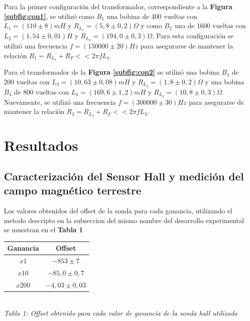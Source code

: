 \documentclass[11pt,a4paper]{article}
\begin{document}
Para la primer configuración del transformador, correspondiente a la \textbf{Figura \ref{subfig:con1}}, se utilizó como $B_1$ una bobina de 400 vueltas con $L_1 = (110 \pm 8)mH$ y $R_{L_1} = (5,8 \pm 0,2)\Omega$ y como $B_2$ una de 1600 vueltas con $L_2 = (1,54 \pm 0,01)H$ y $R_{L_2} = (194,0 \pm 0,3)\Omega$. Para esta configuración se utilizó una frecuencia $f = (150000 \pm 20)Hz$ para asegurarse de mantener la relación $R_1 = R_{L_1}+R_F << 2\pi fL_1$.

Para el transformador de la \textbf{Figura \ref{subfig:con2}} se utilizó una bobina $B_3$ de 200 vueltas con $L_3 = (10,63 \pm 0,08)mH$ y $R_{L_3} = (1,8 \pm 0,2)\Omega$ y una bobina $B_4$ de 800 vueltas con $L_4 = (169,6 \pm 1,2)mH$ y $R_{L_4} = (10,8 \pm 0,3)\Omega$. Nuevamente,  se utilizó una frecuencia $f = (300000 \pm 30)Hz$ para asegurarse de mantener la relación $R_3 = R_{L_3}+R_F << 2\pi fL_3$.




\section{Resultados}
\label{sec:discusion}

\subsection{Caracterización del Sensor Hall y medición del campo magnético terrestre}

Los valores obtenidos del offset de la sonda para cada ganancia, utilizando el metodo descripto en la subseccion del mismo nombre del desarrollo experimental se muestran en el \textbf{Tabla 1}


\bigskip
\begin{minipage}{\linewidth}
\centering
\begin{tabular}{||c|c||}
\hline 
\label{tab:offset}
\textbf{Ganancia} & \textbf{Offset} \\ \hline 
$x1$ & $-853 \pm 7$  \\ \hline 
$x10$ & $-85,0 \pm 0,7$  \\ \hline 
$x200$ & $-4,03 \pm 0,03$  \\ \hline 
\end{tabular}\\[0.3cm]

\textit{Tabla 1: Offset obtenido para cada valor de ganancia de la sonda hall utilizada}
\end{minipage}
\bigskip
\end{document}
